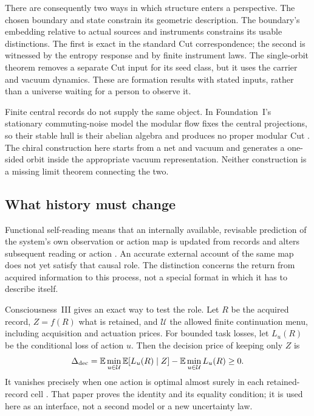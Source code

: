\documentclass[12pt]{article}
\theoremstyle{definition}
\theoremstyle{remark}
\begin{document}
There are consequently two ways in which structure enters a perspective.
The chosen boundary and state constrain its geometric description.
The boundary's embedding relative to actual sources and instruments
constrains its usable distinctions. The first is exact in the standard
Cut correspondence; the second is witnessed by the entropy response
and by finite instrument laws. The single-orbit theorem removes a
separate Cut input for its seed class, but it uses the carrier and
vacuum dynamics. These are formation results with stated inputs,
rather than a universe waiting for a person to observe it.

Finite central records do not supply the same object. In Foundation~I's
stationary commuting-noise model the modular flow fixes the central
projections, so their stable hull is their abelian algebra and produces
no proper modular Cut \cite{FoundationI}. The chiral construction here
starts from a net and vacuum and generates a one-sided orbit inside
the appropriate vacuum representation. Neither construction is a
missing limit theorem connecting the two.

\subsection{What history must change}

Functional self-reading means that an internally available, revisable
prediction of the system's own observation or action map is updated
from records and alters subsequent reading or action
\cite{WorldImprint}. An accurate external account of the same map does
not yet satisfy that causal role. The distinction concerns the return
from acquired information to this process, not a special format in
which it has to describe itself.

Consciousness~III gives an exact way to test the role. Let \(R\) be
the acquired record, \(Z=f(R)\) what is retained, and \(\mathcal U\)
the allowed finite continuation menu, including acquisition and
actuation prices. For bounded task losses, let \(L_u(R)\) be the
conditional loss of action \(u\). Then
the decision price of keeping only \(Z\) is
\begin{equation}
 \Delta_{\rm dec}
 =\mathbb E\min_{u\in\mathcal U}\mathbb E[L_u(R)\mid Z]
   -\mathbb E\min_{u\in\mathcal U}L_u(R)\ge0 .
 \label{eq:perspective-decision}
\end{equation}
It vanishes precisely when one action is optimal almost surely in
each retained-record cell \cite{PaperCIII}. That paper proves the
identity and its equality condition; it is used here as an interface,
not a second model or a new uncertainty law.
\end{document}

